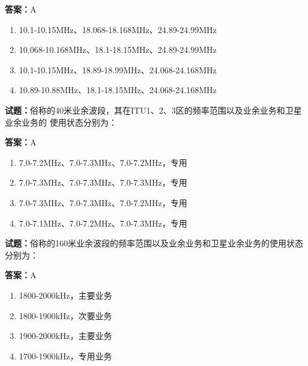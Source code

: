 \documentclass{ctexbook}
\begin{document}
\textbf{答案：}A 

\begin{enumerate}[leftmargin=3em]
  \item 10.1-10.15MHz、18.068-18.168MHz、24.89-24.99MHz 

  \item 10.068-10.168MHz、18.1-18.15MHz、24.89-24.99MHz 

  \item 10.1-10.15MHz、18.89-18.99MHz、24.068-24.168MHz 

  \item 10.89-10.88MHz、18.1-18.15MHz、24.068-24.168MHz 

\end{enumerate}





\vspace{1em}

\textbf{试题：}俗称的40米业余波段，其在ITU1、2、3区的频率范围以及业余业务和卫星业余业务的
使用状态分别为： 

\textbf{答案：}A 

\begin{enumerate}[leftmargin=3em]
  \item 7.0-7.2MHz、7.0-7.3MHz、7.0-7.2MHz，专用 

  \item 7.0-7.3MHz、7.0-7.3MHz、7.0-7.3MHz，专用 

  \item 7.0-7.3MHz、7.0-7.3MHz、7.0-7.2MHz，专用 

  \item 7.0-7.1MHz、7.0-7.2MHz、7.0-7.3MHz，专用 

\end{enumerate}





\vspace{1em}

\textbf{试题：}俗称的160米业余波段的频率范围以及业余业务和卫星业余业务的使用状态分别为： 

\textbf{答案：}A 

\begin{enumerate}[leftmargin=3em]
  \item 1800-2000kHz，主要业务 

  \item 1800-1900kHz，次要业务 

  \item 1900-2000kHz，主要业务 

  \item 1700-1900kHz，专用业务 

\end{enumerate}
\end{document}
